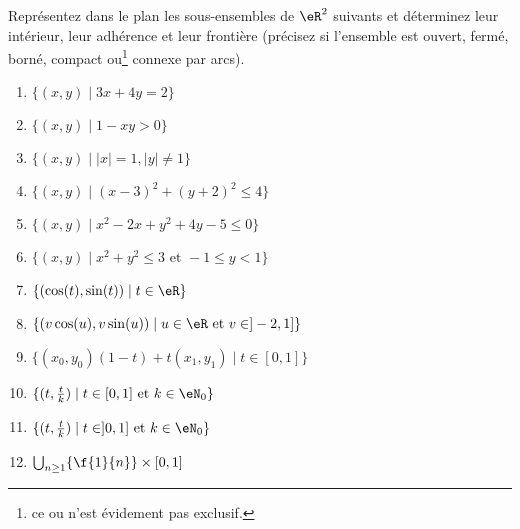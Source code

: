 
\begin{exercice}\label{exo0076}

Représentez dans le plan les sous-ensembles de $\eR^2$ suivants et déterminez leur intérieur, leur adhérence et leur frontière (précisez si l'ensemble est ouvert, fermé, borné, compact ou\footnote{ce \og ou\fg{} n'est évidement pas exclusif.} connexe par arcs).
\begin{enumerate}
\item\label{Item76a} $ \{ (x,y) \mid 3x+4y=2  \} $
\item\label{Item76b}  $ \{ (x,y) \mid 1-xy>0 \} $
\item\label{Item76c}  $ \{ (x,y) \mid |x| =1, |y|\neq1 \} $
\item\label{Item76d}  $ \{ (x,y) \mid (x-3)^2 +(y+2)^2 \leq 4 \} $
\item\label{Item76e}  $ \{ (x,y) \mid x^2 -2x + y^2 + 4y -5 \leq 0 \} $
\item\label{Item76f}  $ \{ (x,y) \mid x^2 + y^2 \leq 3 \mbox{ et } -1 \leq y < 1 \} $
\item\label{Item76g}  $ \{ (\cos(t),\sin(t)) \mid t \in \eR \} $
\item\label{Item76h}  $ \{ (v \cos(u),v \sin(u)) \mid u \in \eR \mbox{ et } v \in ]-2, 1] \}$
\item\label{Item76i}  $ \{ (x_0,y_0)(1-t) + t(x_1,y_1) \mid t\in [0,1] \} $
\item\label{Item76j}  $ \{ (t,\frac{t}{k}) \mid t\in [0,1] \mbox{ et } k\in \eN_0 \} $
\item\label{Item76k}  $ \{ (t,\frac{t}{k}) \mid t\in ]0,1] \mbox{ et } k\in \eN_0 \} $
\item\label{Item76l}  $ \bigcup_{n\geq1}\{\f{1}{n}\}\times[0,1]$
\end{enumerate}

\end{exercice}
